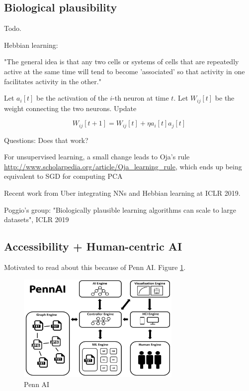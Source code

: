 \documentclass[english]{article}
\begin{document}
\subsection{Biological plausibility}


\benum 
\item Todo.
\item Hebbian learning:

"The general idea is that any two cells or systems of cells that are repeatedly active at the same time will tend to become 'associated' so that activity in one facilitates activity in the other."

\item 

 Let $a_i[t]$ be the activation of the $i$-th neuron at time $t$. Let $W_{ij}[t]$ be the weight connecting the two neurons. Update

$$W_{ij}[t+1]=W_{ij}[t]+\eta a_i[t]a_j[t]$$

\item Questions: Does that work?

\item For unsupervised learning, a small change leads to Oja's rule \url{http://www.scholarpedia.org/article/Oja_learning_rule}, which ends up being equivalent to SGD for computing PCA


\item Recent work from Uber integrating NNs and Hebbian learning at ICLR 2019. 

Poggio's group: "Biologically plausible learning algorithms can scale to large datasets", ICLR 2019

\eenum 


\subsection{Accessibility + Human-centric AI}


\benum 
\item Motivated to read about this because of Penn AI. Figure \ref{Penn AI}.

\begin{figure}[h!]
  \centering
  \includegraphics[width=0.7\textwidth]{pennai}
  \caption{Penn AI}
  \label{Penn AI}
\end{figure}
\end{document}
